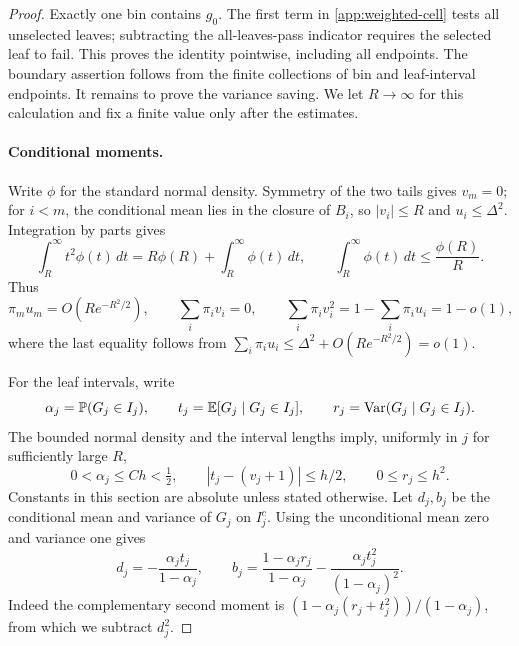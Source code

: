 \begin{proof}
Exactly one bin contains $g_0$. The first term in
\eqref{app:weighted-cell} tests all unselected leaves; subtracting
the all-leaves-pass indicator requires the selected leaf to fail.
This proves the identity pointwise, including all endpoints.
The boundary assertion follows from the finite collections of bin
and leaf-interval endpoints. It remains to prove the variance saving.
We let $R\to\infty$ for this calculation and fix a finite value only
after the estimates.

\paragraph{Conditional moments.}
Write $\phi$ for the standard normal density. Symmetry of the two
tails gives $v_m=0$; for $i<m$, the conditional mean lies in the
closure of $B_i$, so $|v_i|\le R$ and $u_i\le\Delta^2$.
Integration by parts gives
\[
 \int_R^\infty t^2\phi(t)\,dt
 =R\phi(R)+\int_R^\infty\phi(t)\,dt,
 \qquad
 \int_R^\infty\phi(t)\,dt\le\frac{\phi(R)}R.
\]
Thus
\begin{equation}\label{app:weighted-bin-moments}
 \pi_m u_m=O(Re^{-R^2/2}),\qquad
 \sum_i\pi_i v_i=0,\qquad
 \sum_i\pi_i v_i^2=1-\sum_i\pi_i u_i=1-o(1),
\end{equation}
where the last equality follows from
$\sum_i\pi_i u_i\le\Delta^2+O(Re^{-R^2/2})=o(1)$.

For the leaf intervals, write
\[
 \alpha_j=\mathbb P(G_j\in I_j),\qquad
 t_j=\mathbb E[G_j\mid G_j\in I_j],\qquad
 r_j=\operatorname{Var}(G_j\mid G_j\in I_j).
\]
The bounded normal density and the interval lengths imply, uniformly
in $j$ for sufficiently large $R$,
\begin{equation}\label{app:weighted-rare-moments}
 0<\alpha_j\le Ch<\tfrac12,\qquad
 |t_j-(v_j+1)|\le h/2,\qquad 0\le r_j\le h^2.
\end{equation}
Constants in this section are absolute unless stated otherwise.
Let $d_j,b_j$ be the conditional mean and variance of $G_j$ on
$I_j^c$. Using the unconditional mean zero and variance one gives
\begin{equation}\label{app:weighted-complement}
 d_j=-\frac{\alpha_jt_j}{1-\alpha_j},\qquad
 b_j=\frac{1-\alpha_jr_j}{1-\alpha_j}
       -\frac{\alpha_jt_j^2}{(1-\alpha_j)^2}.
\end{equation}
Indeed the complementary second moment is
$(1-\alpha_j(r_j+t_j^2))/(1-\alpha_j)$, from which we subtract
$d_j^2$.


\end{proof}
